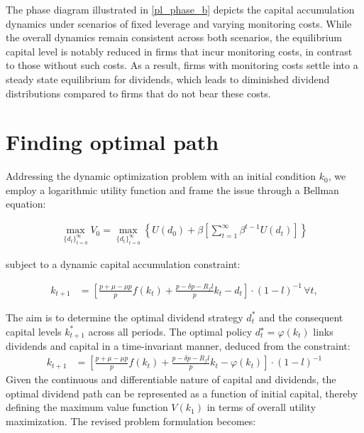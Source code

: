 \documentclass[12pt]{report}
\begin{document}
The phase diagram illustrated in \ref{pl_phase_b} depicts the capital accumulation dynamics under scenarios of fixed
leverage and varying monitoring costs. While the overall dynamics remain consistent across both scenarios, the
equilibrium capital level is notably reduced in firms that incur monitoring costs, in contrast to those without such
costs. As a result, firms with monitoring costs settle into a steady state equilibrium for dividends, which
leads to diminished dividend distributions compared to firms that do not bear these costs. 

\section{Finding optimal path}
 Addressing the dynamic optimization problem with an initial condition \(k_0\), we employ a logarithmic utility function
 and frame the issue through a Bellman equation:


 \begin{align*}
     \max _{\{d_t\}_{t=0}^{\infty}} V_0 = \max _{\{d_t\}_{t=0}^{\infty}} \left\{U(d_0) + \beta \left[\sum_{t=1}^{\infty} \beta^{t-1} U(d_t)\right]\right\}
 \end{align*}


 subject to a dynamic capital accumulation constraint:

 \begin{align*}
    k_{t+1} &= \left[ \frac{p + \mu - \mu p}{p}f(k_{t}) + \frac{p - \delta p - R_f l}{p} k_{t}  - d_{t} \right] \cdot \left(1-l\right)^{-1} \, \forall t,
\end{align*}

 The aim is to determine the optimal dividend strategy \(d_t^*\) and the consequent capital levels \(k_{t+1}^*\) across
 all periods. The optimal policy \(d_t^{\star}=\varphi(k_t)\) links dividends and capital in a time-invariant manner, deduced from the
 constraint:
 \begin{align*}
    k_{t+1} &= \left[ \frac{p + \mu - \mu p}{p}f(k_{t}) + \frac{p - \delta p - R_f l}{p} k_{t}  - \varphi(k_{t}) \right] \cdot \left(1-l\right)^{-1} 
\end{align*}
 Given the continuous and differentiable nature of capital and dividends, the optimal dividend path can be represented as
 a function of initial capital, thereby defining the maximum value function \(V(k_1)\) in terms of overall utility
 maximization. The revised problem formulation becomes:
\end{document}
